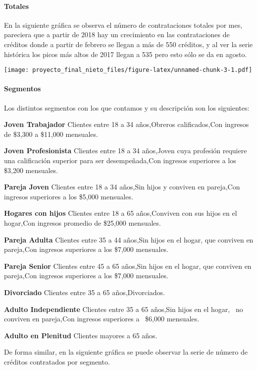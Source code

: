 \documentclass[]{article}
\let\oldparagraph\paragraph
\renewcommand{\paragraph}[1]{\oldparagraph{#1}\mbox{}}
\begin{document}
\paragraph{Totales}\label{totales}

En la siguiente gráfica se observa el número de contrataciones totales
por mes, pareciera que a partir de 2018 hay un crecimiento en las
contrataciones de créditos donde a partir de febrero se llegan a más de
550 créditos, y al ver la serie histórica los picos más altos de 2017
llegan a 535 pero esto sólo se da en agosto.

\texttt{[image: proyecto\_final\_nieto\_files/figure-latex/unnamed-chunk-3-1.pdf]}

\paragraph{Segmentos}\label{segmentos}

Los distintos segmentos con los que contamos y su descripción son los
siguientes:

\textbf{Joven Trabajador} Clientes entre 18 a 34 años,Obreros
calificados,Con ingresos de \$3,300 a \$11,000 mensuales.

\textbf{Joven Profesionista} Clientes entre 18 a 34 años,Joven cuya
profesión requiere una calificación superior para ser desempeñada,Con
ingresos superiores a los \$3,200 mensuales.

\textbf{Pareja Joven} Clientes entre 18 a 34 años,Sin hijos y conviven
en pareja,Con ingresos superiores a los \$5,000 mensuales.

\textbf{Hogares con hijos} Clientes entre 18 a 65 años,Conviven con sus
hijos en el hogar,Con ingresos promedio de \$25,000 mensuales.

\textbf{Pareja Adulta} Clientes entre 35 a 44 años,Sin hijos en el
hogar, que conviven en pareja,Con ingresos superiores a los \$7,000
mensuales.

\textbf{Pareja Senior} Clientes entre 45 a 65 años,Sin hijos en el
hogar, que conviven en pareja,Con ingresos superiores a los \$7,000
mensuales.

\textbf{Divorciado} Clientes entre 35 a 65 años,Divorciados.

\textbf{Adulto Independiente} Clientes entre 35 a 65 años,Sin hijos en
el hogar, ~no conviven en pareja,Con ingresos superiores a ~\$6,000
mensuales.

\textbf{Adulto en Plenitud} Clientes mayores a 65 años.

De forma similar, en la siguiente gráfica se puede observar la serie de
número de créditos contratados por segmento.
\end{document}
